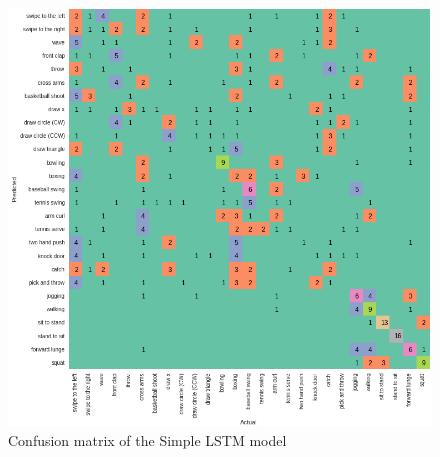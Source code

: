 \documentclass[conference]{IEEEtran}
\begin{document}
\begin{figure}[H]
\begin{center}
\includegraphics[scale=0.3]{simple_LSTM/simpleLSTM_confusion_matrix.png}
\end{center}
\caption{\label{fig:confusion_matrix_simple_LSTM} 
Confusion matrix of the Simple LSTM model}
\end{figure}
\end{document}
